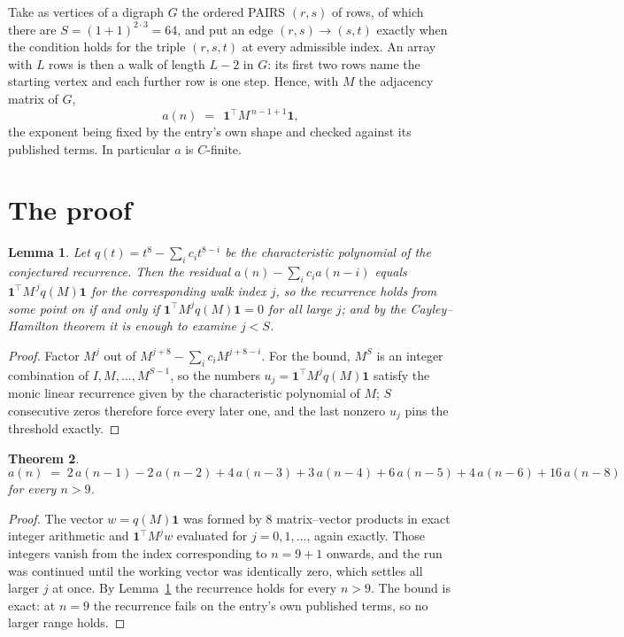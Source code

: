 \documentclass[11pt,a4paper]{article}
\theoremstyle{plain}
\newtheorem{theorem}{Theorem}
\newtheorem{lemma}[theorem]{Lemma}
\theoremstyle{definition}
\begin{document}
Take as vertices of a digraph $G$ the ordered PAIRS $(r,s)$ of rows, of which there are
$S=(1+1)^{2\cdot3}=64$, and put an edge $(r,s)\to(s,t)$ exactly when the condition
holds for the triple $(r,s,t)$ at every admissible index. An array with $L$ rows is then a
walk of length $L-2$ in $G$: its first two rows name the starting vertex and each further
row is one step. Hence, with $M$ the adjacency matrix of $G$,
\[
a(n)\;=\;\,\mathbf{1}^{\!\top}M^{\,n-1+1}\mathbf{1},
\]
the exponent being fixed by the entry's own shape and checked against its published terms.
In particular $a$ is $C$-finite.

\section{The proof}

\begin{lemma}\label{lem:crit}
Let $q(t)=t^{8}-\sum_i c_it^{8-i}$ be the characteristic polynomial of the
conjectured recurrence. Then the residual $a(n)-\sum_ic_ia(n-i)$ equals
$\mathbf{1}^{\!\top}M^{\,j}q(M)\mathbf{1}$ for the corresponding walk index
$j$, so the recurrence holds from some point on if and only if
$\mathbf{1}^{\!\top}M^{j}q(M)\mathbf{1}=0$ for all large $j$; and by the
Cayley--Hamilton theorem it is enough to examine $j<S$.
\end{lemma}

\begin{proof}
Factor $M^{j}$ out of $M^{j+8}-\sum_ic_iM^{j+8-i}$. For the bound, $M^{S}$
is an integer combination of $I,M,\dots,M^{S-1}$, so the numbers
$u_j=\mathbf{1}^{\!\top}M^{j}q(M)\mathbf{1}$ satisfy the monic linear recurrence given by
the characteristic polynomial of $M$; $S$ consecutive zeros therefore force every later one,
and the last nonzero $u_j$ pins the threshold exactly.
\end{proof}

\begin{theorem}
\[
a(n)\;=\;2\,a(n-1) - 2\,a(n-2) + 4\,a(n-3) + 3\,a(n-4) + 6\,a(n-5) + 4\,a(n-6) + 16\,a(n-8)
\]
for every $n>9$.
\end{theorem}

\begin{proof}
The vector $w=q(M)\mathbf{1}$ was formed by $8$ matrix--vector products in exact
integer arithmetic and $\mathbf{1}^{\!\top}M^{j}w$ evaluated for $j=0,1,\dots$, again
exactly. Those integers vanish from the index corresponding to $n=9+1$ onwards, and the
run was continued until the working vector was identically zero, which settles all larger $j$
at once. By Lemma~\ref{lem:crit} the recurrence holds for every $n>9$. The bound is exact: at $n=9$ the recurrence fails on the entry's own published terms, so no larger range holds.
\end{proof}
\end{document}
